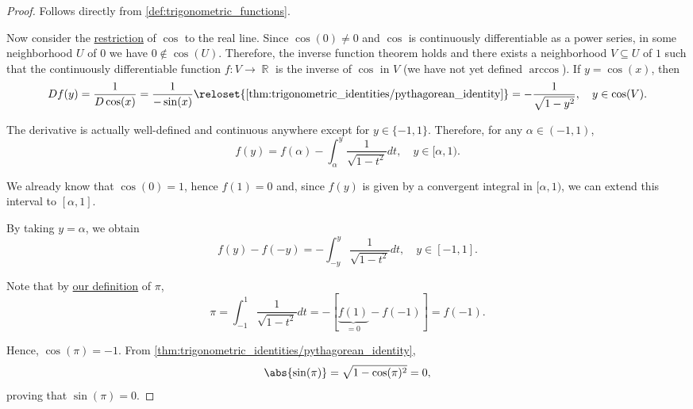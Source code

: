 \begin{proof}
   Follows directly from \cref{def:trigonometric_functions}.

   Now consider the \hyperref[def:set_valued_function/restriction]{restriction} of \( \cos \) to the real line. Since \( \cos(0) \neq 0 \) and \( \cos \) is continuously differentiable as a power series, in some neighborhood \( U \) of \( 0 \) we have \( 0 \notin \cos(U) \). Therefore, the inverse function theorem holds and there exists a neighborhood \( V \subseteq U \) of \( 1 \) such that the continuously differentiable function \( f: V \to \BbbR \) is the inverse of \( \cos \) in \( V \) (we have not yet defined \hyperref[def:inverse_trigonometric_functions/arccos]{\( \arccos \)}). If \( y = \cos(x) \), then
  \begin{equation*}
    Df(y)
    =
    \frac 1 {D\cos(x)}
    =
    \frac 1 {-\sin(x)}
    \reloset {\ref{thm:trigonometric_identities/pythagorean_identity}} =
    -\frac 1 {\sqrt{1 - y^2}},
    \quad y \in \cos(V).
  \end{equation*}

  The derivative is actually well-defined and continuous anywhere except for \( y \in \{ -1, 1 \} \). Therefore, for any \( \alpha \in (-1, 1) \),
  \begin{equation*}
    f(y) = f(\alpha) - \int_{\alpha}^y \frac 1 {\sqrt{1 - t^2}} dt, \quad y \in [\alpha, 1).
  \end{equation*}

  We already know that \( \cos(0) = 1 \), hence \( f(1) = 0 \) and, since \( f(y) \) is given by a convergent integral in \( [\alpha, 1) \), we can extend this interval to \( [\alpha, 1] \).

  By taking \( y = \alpha \), we obtain
  \begin{equation*}
    f(y) - f(-y) = -\int_{-y}^y \frac 1 {\sqrt{1 - t^2}} dt, \quad y \in [-1, 1].
  \end{equation*}

  Note that by \hyperref[def:pi]{our definition} of \( \pi \),
  \begin{equation*}
    \pi
    =
    \int_{-1}^1 \frac 1 {\sqrt{1 - t^2}} dt
    =
    -[\underbrace{f(1)}_{=0} - f(-1)]
    =
    f(-1).
  \end{equation*}

  Hence, \( \cos(\pi) = -1 \). From \cref{thm:trigonometric_identities/pythagorean_identity},
  \begin{equation*}
    \abs{\sin(\pi)} = \sqrt{1 - \cos(\pi)^2} = 0,
  \end{equation*}
  proving that \( \sin(\pi) = 0 \).


\end{proof}

